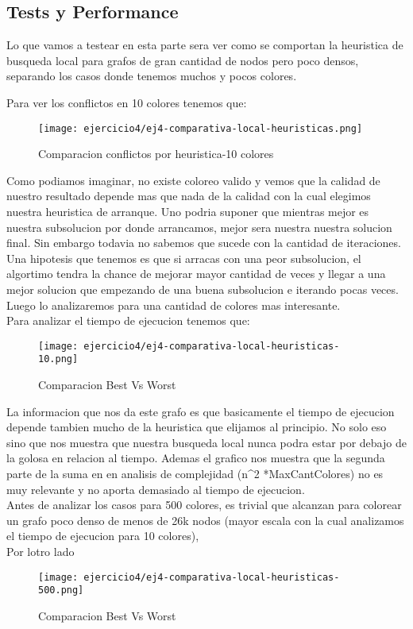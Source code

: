 \subsection{Tests y Performance}

Lo que vamos a testear en esta parte sera ver como se comportan la heuristica de busqueda local para grafos de gran cantidad de nodos pero poco densos, separando los casos donde tenemos muchos y pocos colores. 

Para ver los conflictos en 10 colores tenemos que:
\pagebreak

\begin{figure}[h!]
\texttt{[image: ejercicio4/ej4-comparativa-local-heuristicas.png]}
\centering
\caption{Comparacion conflictos por heuristica-10 colores}
\label{overflow3}
\end{figure}
Como podiamos imaginar, no existe coloreo valido y vemos que la calidad de nuestro resultado depende mas que nada de la calidad con la cual elegimos nuestra heuristica de arranque. Uno podria suponer que mientras mejor es nuestra subsolucion por donde arrancamos, mejor sera nuestra nuestra solucion final. Sin embargo todavia no sabemos que sucede con la cantidad de iteraciones. Una hipotesis que tenemos es que si arracas con una peor subsolucion, el algortimo tendra la chance de mejorar mayor cantidad de veces y llegar a una mejor solucion que empezando de una buena subsolucion e iterando pocas veces. Luego lo analizaremos para una cantidad de colores mas interesante.\\  

Para analizar el tiempo de ejecucion tenemos que:
\begin{figure}[h!]
\texttt{[image: ejercicio4/ej4-comparativa-local-heuristicas-10.png]}
\centering
\caption{Comparacion Best Vs Worst}
\label{overflow3}
\end{figure}
\pagebreak
La informacion que nos da este grafo es que basicamente el tiempo de ejecucion depende tambien mucho de la heuristica que elijamos al principio. No solo eso sino que nos muestra que nuestra busqueda local nunca podra estar por debajo de la golosa en relacion al tiempo. Ademas el grafico nos muestra que la segunda parte de la suma en en analisis de complejidad (n^2 *MaxCantColores) no es muy relevante y no aporta demasiado al tiempo de ejecucion.\\

Antes de analizar los casos para 500 colores, es trivial que alcanzan para colorear un grafo poco denso de menos de 26k nodos (mayor escala con la cual analizamos el tiempo de ejecucion para 10 colores),\\
Por lotro lado
\begin{figure}[h!]
\texttt{[image: ejercicio4/ej4-comparativa-local-heuristicas-500.png]}
\centering
\caption{Comparacion Best Vs Worst}
\label{overflow3}
\end{figure}

